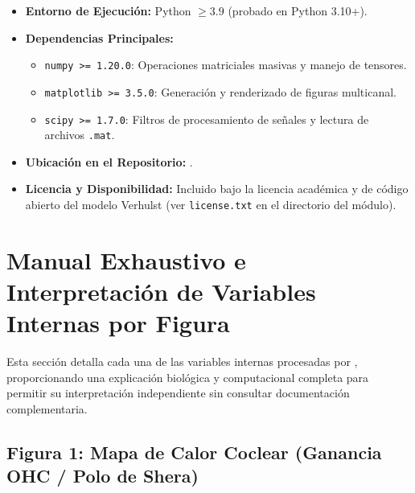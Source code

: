 \documentclass[12pt,a4paper]{article}
\begin{document}
\begin{itemize}
    \item \textbf{Entorno de Ejecución:} Python $\ge 3.9$ (probado en Python 3.10+).
    \item \textbf{Dependencias Principales:}
    \begin{itemize}
        \item \texttt{numpy >= 1.20.0}: Operaciones matriciales masivas y manejo de tensores.
        \item \texttt{matplotlib >= 3.5.0}: Generación y renderizado de figuras multicanal.
        \item \texttt{scipy >= 1.7.0}: Filtros de procesamiento de señales y lectura de archivos \texttt{.mat}.
    \end{itemize}
    \item \textbf{Ubicación en el Repositorio:} .
    \item \textbf{Licencia y Disponibilidad:} Incluido bajo la licencia académica y de código abierto del modelo Verhulst (ver \texttt{license.txt} en el directorio del módulo).
\end{itemize}

\newpage
\section{Manual Exhaustivo e Interpretación de Variables Internas por Figura}

Esta sección detalla cada una de las variables internas procesadas por , proporcionando una explicación biológica y computacional completa para permitir su interpretación independiente sin consultar documentación complementaria.

\subsection{Figura 1: Mapa de Calor Coclear (Ganancia OHC / Polo de Shera)}
\end{document}
